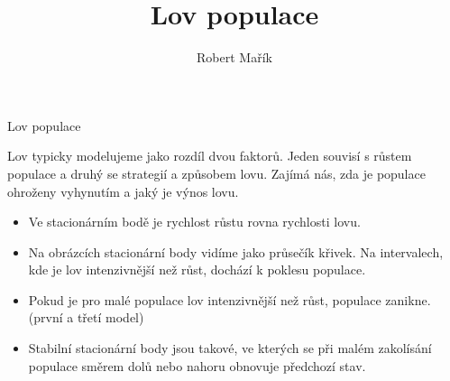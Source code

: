 \documentclass[handouts]{beamer}
\title{Lov populace}
\author{Robert Mařík}
\begin{document}
\begin{frame}

  \begin{center}
    \large Lov populace
  \end{center}

  Lov typicky modelujeme jako rozdíl dvou faktorů. Jeden souvisí s růstem populace a druhý se strategií a způsobem lovu. Zajímá nás, zda je populace ohroženy vyhynutím a jaký je výnos lovu.

\begin{itemize}
\item Ve stacionárním bodě je rychlost růstu rovna rychlosti lovu. 
\item Na obrázcích stacionární body vidíme jako průsečík křivek. Na intervalech, kde je
  lov intenzivnější než růst, dochází k poklesu populace.
\item Pokud je pro malé populace lov intenzivnější než růst, populace zanikne.  (první a třetí model)
\item Stabilní stacionární body jsou takové, ve kterých se při malém zakolísání populace směrem dolů nebo nahoru obnovuje předchozí stav. 
\end{itemize}
\everymath{\displaystyle} 


\end{frame}
\end{document}
